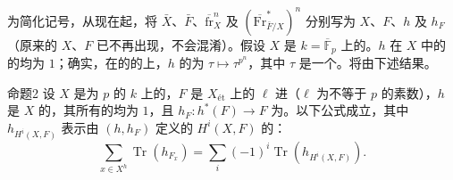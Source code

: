 为简化记号，从现在起，将 $\bar X$、$\bar F$、$\overline{\mathrm{fr}}_X^n$ 及 $(\overline{\mathrm{Fr}}_{\bar F/X}^{*})^n$ 分别写为 $X$、$F$、$h$ 及 $h_F$（原来的 $X$、$F$ 已不再出现，不会混淆）。假设 $X$ 是 $k=\overline{\mathbb F}_p$ 上的。$h$ 在 $X$ 中的的均为 $1$；确实，在的的上，$h$ 的为 $\tau\mapsto\tau^{p^n}$，其中 $\tau$ 是一个。将由下述结果。
\begin{SGAresult}{命题}{2}
设 $X$ 是为 $p$ 的 $k$ 上的，$F$ 是 $X_{\text{ét}}$ 上的
 $\ell$ 进（$\ell$ 为不等于 $p$ 的素数），$h$ 是 $X$ 的，其所有的均为 $1$，且 $h_F:h^*(F)\to F$ 为。以下公式成立，其中 $h_{H^i(X,F)}$ 表示由 $(h,h_F)$ 定义的 $H^i(X,F)$ 的：
\[
\sum_{x\in X^h}\operatorname{Tr}(h_{F_x})
=\sum_i(-1)^i\operatorname{Tr}(h_{H^i(X,F)}).
\tag{2''}
\]
\end{SGAresult}
